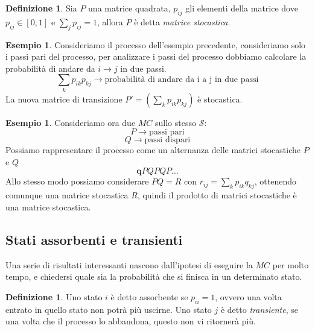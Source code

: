 \documentclass{article}
\theoremstyle{definition}
\newtheorem{definition}[theorem]{Definizione}
\newtheorem{example}[theorem]{Esempio}
\theoremstyle{remark}
\begin{document}
\begin{definition}
    Sia $P$ una matrice quadrata, $p_{ij}$ gli elementi della matrice dove $p_{ij}\in[0,1]$ e $\sum_j p_{ij} = 1$, 
    allora $P$ è detta \textit{matrice stocastica}.
\end{definition}
\begin{example}
    Consideriamo il processo dell'esempio precedente, consideriamo solo i passi pari del processo, per analizzare i passi del processo dobbiamo calcolare
    la probabilità di andare da $i\to j$ in due passi. 
    $$\sum_k p_{ik}p_{kj}\rightarrow\text{probabilità di andare da i a j in due passi}$$
    La nuova matrice di transizione $P' = (\sum_k p_{ik}p_{kj})$  è stocastica.
\end{example}
\begin{example}
    Consideriamo ora due $MC$ sullo stesso $\mathcal{S}$:
    $$ P\to \text{passi pari}$$
    $$ Q\to \text{passi dispari}$$
    Possiamo rappresentare il processo come un alternanza delle matrici stocastiche $P$ e $Q$
    $$\boldsymbol{q}PQPQP\dots$$
    Allo stesso modo possiamo considerare  $PQ=R$ con $r_{ij} = \sum_k p_{ik}q_{kj}$, ottenendo comunque una matrice stocastica $R$,
    quindi il prodotto di matrici stocastiche è una matrice stocastica.
\end{example}
\subsection{Stati assorbenti e transienti}
Una serie di risultati interessanti nascono dall'ipotesi di eseguire la $MC$ per molto tempo, e chiedersi quale sia la probabilità che 
si finisca in un determinato stato.
\begin{definition}
    Uno stato $i$ è detto assorbente se $p_{ii} = 1$, ovvero una volta entrato in quello stato non potrà più uscirne. Uno stato $j$ è detto \textit{transiente}, 
    se una volta che il processo lo abbandona, questo non vi ritornerà più.
\end{definition}
\end{document}
